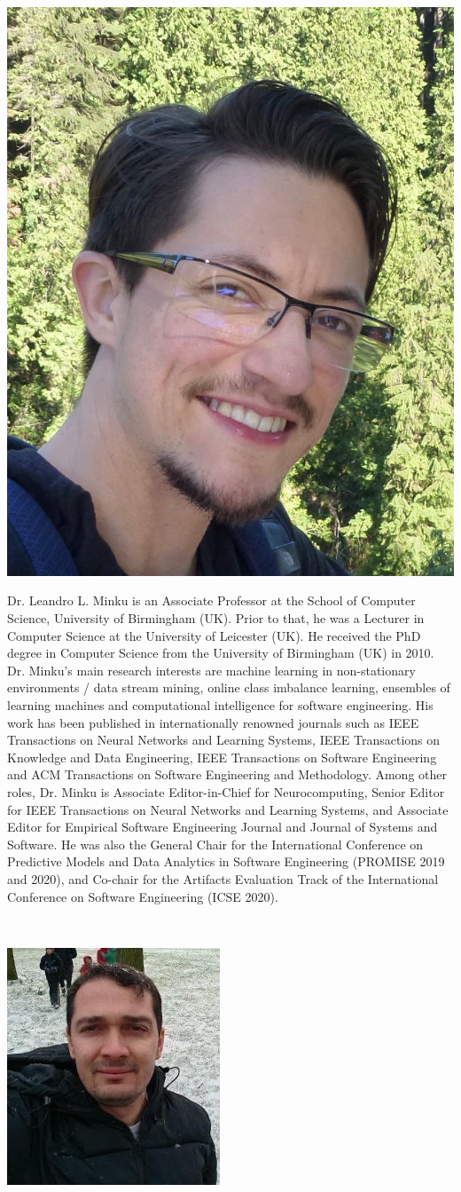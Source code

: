 \abouteditors

\vspace{-2cm}
\begin{center}
\includegraphics[width=.3\textwidth]{Photos/minku.jpg}
\end{center}

Dr. Leandro L. Minku is an Associate Professor at the School of Computer Science, University of Birmingham (UK). Prior to that, he was a Lecturer in Computer Science at the University of Leicester (UK). He received the PhD degree in Computer Science from the University of Birmingham (UK) in 2010. Dr. Minku's main research interests are machine learning in non-stationary environments / data stream mining, online class imbalance learning, ensembles of learning machines and computational intelligence for software engineering. His work has been published in internationally renowned journals such as IEEE Transactions on Neural Networks and Learning Systems, IEEE Transactions on Knowledge and Data Engineering, IEEE Transactions on Software Engineering and ACM Transactions on Software Engineering and Methodology. Among other roles, Dr. Minku is Associate Editor-in-Chief for Neurocomputing, Senior Editor for IEEE Transactions on Neural Networks and Learning Systems, and Associate Editor for Empirical Software Engineering Journal and Journal of Systems and Software. He was also the General Chair for the International Conference on Predictive Models and Data Analytics in Software Engineering (PROMISE 2019 and 2020), and Co-chair for the Artifacts Evaluation Track of the International Conference on Software Engineering (ICSE 2020).

\newpage
\

\vspace{3cm}
\begin{center}
\includegraphics[width=.3\textwidth]{Photos/cabral.jpg}
\end{center}

